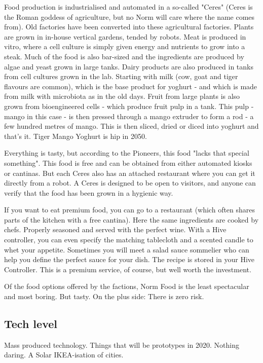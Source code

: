 Food production is industrialised and automated in a so-called "Ceres" (Ceres is the Roman goddess of agriculture, but no Norm will care where the name comes from). Old factories have been converted into these agricultural factories. Plants are grown in in-house vertical gardens, tended by robots.
Meat is produced in vitro, where a cell culture is simply given energy and nutrients to grow into a steak. Much of the food is also bar-sized and the ingredients are produced by algae and yeast grown in large tanks.
Dairy products are also produced in tanks from cell cultures grown in the lab. Starting with milk (cow, goat and tiger flavours are common), which is the base product for yoghurt - and which is made from milk with microbiota as in the old days.
Fruit from large plants is also grown from bioengineered cells - which produce fruit pulp in a tank. This pulp - mango in this case - is then pressed through a mango extruder to form a rod - a few hundred metres of mango. This is then sliced, dried or diced into yoghurt and that's it. Tiger Mango Yoghurt is hip in 2050.

Everything is tasty, but according to the Pioneers, this food "lacks that special something".
This food is free and can be obtained from either automated kiosks or cantinas. But each Ceres also has an attached restaurant where you can get it directly from a robot. A Ceres is designed to be open to visitors, and anyone can verify that the food has been grown in a hygienic way.

If you want to eat premium food, you can go to a restaurant (which often shares parts of the kitchen with a free cantina). Here the same ingredients are cooked by chefs. Properly seasoned and served with the perfect wine. With a Hive controller, you can even specify the matching tablecloth and a scented candle to whet your appetite.
Sometimes you will meet a salad sauce sommelier who can help you define the perfect sauce for your dish. The recipe is stored in your Hive Controller. This is a premium service, of course, but well worth the investment.

Of the food options offered by the factions, Norm Food is the least spectacular and most boring. But tasty. On the plus side: There is zero risk.

\subsection{Tech level}

Mass produced technology. Things that will be prototypes in 2020. Nothing daring. A Solar IKEA-isation of cities.

